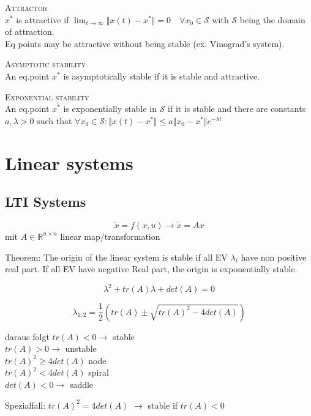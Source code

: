 \textsc{Attractor}\\
$x^*$ is attractive if $\lim_{t\rightarrow \infty} \Vert x(t)-x^* \Vert = 0 \quad \forall x_0 \in \mathcal{S}$ with $\mathcal{S}$ being the domain of attraction.\\
Eq points may be attractive without being stable (ex. Vinograd's system).

\textsc{Asymptotic stability}\\
An eq.point $x^*$ is asymptotically stable if it is stable and attractive.

\textsc{Exponential stability}\\
An eq.point $x^*$ is exponentially stable in $\mathcal{S}$ if it is stable and there are constants $a, \lambda > 0$ such that $\forall x_0 \in \mathcal{S}: \Vert x(t)-x^*\Vert \leq a\Vert x_0 - x^* \Vert e^{-\lambda t}$

\section{Linear systems}
\subsection{LTI Systems}
\[ \dot{x} = f(x,u) \rightarrow \dot{x} = Ax \]
mit $A \in \mathbb{R}^{n \times n}$ linear map/transformation

Theorem:
The origin of the linear system is stable if all EV $\lambda_i$ have non positive real part. If all EV have negative Real part, the origin is exponentially stable.

\[ \lambda^2+tr(A)\lambda+det(A) = 0 \]

\[ \lambda_{1,2} = \frac{1}{2} \left( tr(A) \pm \sqrt{tr(A)^2-4det(A)}\right) \]

daraus folgt
$tr(A) < 0 \rightarrow$ stable\\
$tr(A) > 0 \rightarrow$ unstable\\
$tr(A)^2 \geq 4det(A)$ node\\
$tr(A)^2 < 4det(A)$ spiral\\
$det(A) < 0 \rightarrow$ saddle

Spezialfall:
$tr(A)^2 = 4det(A)$ $\rightarrow$ stable if $tr(A) < 0$\\



